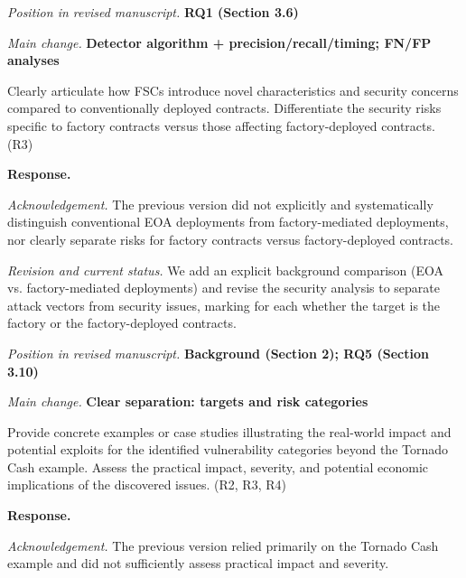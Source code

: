 \documentclass[acmsmall]{acmart}
\begin{document}
	\vspace{0.25em}
	\textit{Position in revised manuscript.} {\color{red}\textbf{RQ1 (Section 3.6)}}

	\textit{Main change.} {\color{blue}\textbf{Detector algorithm + precision/recall/timing; FN/FP analyses}}

	\begin{tcolorbox}
		[commentbox,title=Editor/AE -- Comment 3] Clearly articulate how FSCs introduce novel
		characteristics and security concerns compared to conventionally deployed contracts. Differentiate
		the security risks specific to factory contracts versus those affecting factory-deployed contracts.
		(R3)
	\end{tcolorbox}

	\noindent
	\textbf{Response.}

	\textit{Acknowledgement.} The previous version did not explicitly and systematically distinguish
	conventional EOA deployments from factory-mediated deployments, nor clearly separate risks for factory
	contracts versus factory-deployed contracts.

	\textit{Revision and current status.} We add an explicit background comparison (EOA vs. factory-mediated
	deployments) and revise the security analysis to separate attack vectors from security issues,
	marking for each whether the target is the factory or the factory-deployed contracts.

	\vspace{0.25em}
	\textit{Position in revised manuscript.} {\color{red}\textbf{Background (Section 2); RQ5 (Section 3.10)}}

	\textit{Main change.} {\color{blue}\textbf{Clear separation: targets and risk categories}}

	\begin{tcolorbox}
		[commentbox,title=Editor/AE -- Comment 4] Provide concrete examples or case studies
		illustrating the real-world impact and potential exploits for the identified vulnerability
		categories beyond the Tornado Cash example. Assess the practical impact, severity, and potential
		economic implications of the discovered issues. (R2, R3, R4)
	\end{tcolorbox}

	\noindent
	\textbf{Response.}

	\textit{Acknowledgement.} The previous version relied primarily on the Tornado Cash example and
	did not sufficiently assess practical impact and severity.
\end{document}
